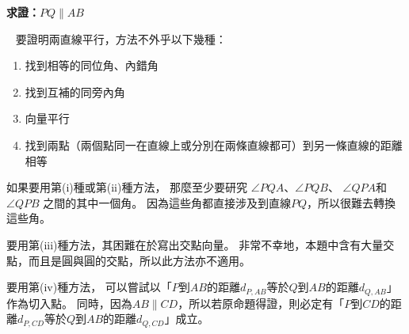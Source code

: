 \documentclass{article}
\newcommand{\INDEX}[1]{\fbox{\textbf{#1}}\ }
\begin{document}
\textbf{求證：}$PQ\parallel AB$
\begin{center} %
\end{center}
\newpage
\INDEX{證明：}\setcounter{equation}{0}
要證明兩直線平行，方法不外乎以下幾種：
\begin{enumerate}[label=(\roman*)]
  \item 找到相等的同位角、內錯角
  \item 找到互補的同旁內角
  \item 向量平行
  \item 找到兩點（兩個點同一在直線上或分別在兩條直線都可）到另一條直線的距離相等
\end{enumerate}
如果要用第(i)種或第(ii)種方法，
那麼至少要研究 $\angle{PQA}$、$\angle{PQB}$、
$\angle{QPA}$和$\angle{QPB}$ 之間的其中一個角。
因為這些角都直接涉及到直線$PQ$，所以很難去轉換這些角。

要用第(iii)種方法，其困難在於寫出交點向量。
非常不幸地，本題中含有大量交點，而且是圓與圓的交點，所以此方法亦不適用。

要用第(iv)種方法，
可以嘗試以「$P$到$AB$的距離$d_{P,AB}$等於$Q$到$AB$的距離$d_{Q,AB}$」作為切入點。
同時，因為$AB\parallel CD$，所以若原命題得證，則必定有「$P$到$CD$的距離$d_{P,CD}$等於$Q$到$AB$的距離$d_{Q,CD}$」成立。
\end{document}
